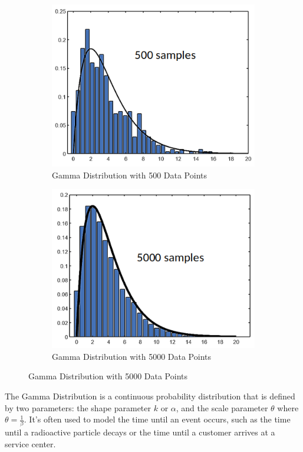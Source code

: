\documentclass{article}
\theoremstyle{mytheoremstyle}
\theoremstyle{mytheoremstyle}
\theoremstyle{myproblemstyle}
\begin{document}
\begin{figure}[htbp]
    \begin{subfigure}[b]{0.5\textwidth}
        \includegraphics[width=\linewidth]{gamma_5.png}
        \caption{Gamma Distribution with 500 Data Points}
    \end{subfigure}
    \begin{subfigure}[b]{0.5\textwidth}
        \includegraphics[width=\linewidth]{gamma_5k.png}
        \caption{Gamma Distribution with 5000 Data Points}        
    \end{subfigure}
\end{figure}
The Gamma Distribution is a continuous probability distribution that is defined by two parameters: the shape parameter $k$ or $\alpha$, and the scale parameter $\theta$ where $ \theta = \frac{1}{\beta} $. It's often used to model the time until an event occurs, such as the time until a radioactive particle decays or the time until a customer arrives at a service center.
\end{document}
